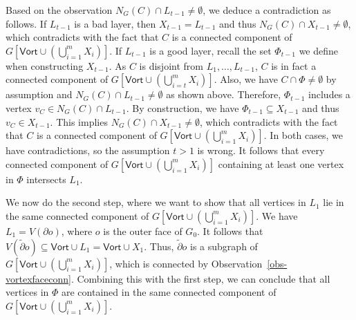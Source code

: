 \documentclass[a4paper,11pt]{article}
\numberwithin{lemma}{section}
\begin{document}
Based on the observation $N_G(C) \cap L_{t-1} \neq \emptyset$, we deduce a contradiction as follows.
If $L_{t-1}$ is a bad layer, then $X_{t-1} = L_{t-1}$ and thus $N_G(C) \cap X_{t-1} \neq \emptyset$, which contradicts with the fact that $C$ is a connected component of $G[\mathsf{Vort} \cup (\bigcup_{i=1}^m X_i)]$.
If $L_{t-1}$ is a good layer, recall the set $\varPhi_{t-1}$ we define when constructing $X_{t-1}$.
As $C$ is disjoint from $L_1,\dots,L_{t-1}$, $C$ is in fact a connected component of $G[\mathsf{Vort} \cup (\bigcup_{i=t}^m X_i)]$.
Also, we have $C \cap \varPhi \neq \emptyset$ by assumption and $N_G(C) \cap L_{t-1} \neq \emptyset$ as shown above.
Therefore, $\varPhi_{t-1}$ includes a vertex $v_C \in N_G(C) \cap L_{t-1}$.
By construction, we have $\varPhi_{t-1} \subseteq X_{t-1}$ and thus $v_C \in X_{t-1}$.
This implies $N_G(C) \cap X_{t-1} \neq \emptyset$, which contradicts with the fact that $C$ is a connected component of $G[\mathsf{Vort} \cup (\bigcup_{i=1}^m X_i)]$.
In both cases, we have contradictions, so the assumption $t>1$ is wrong.
It follows that every connected component of $G[\mathsf{Vort} \cup (\bigcup_{i=1}^m X_i)]$ containing at least one vertex in $\varPhi$ intersects $L_1$.

We now do the second step, where we want to show that all vertices in $L_1$ lie in the same connected component of $G[\mathsf{Vort} \cup (\bigcup_{i=1}^m X_i)]$.
We have $L_1 = V(\partial o)$, where $o$ is the outer face of $G_0$.
It follows that $V(\tilde{\partial} o) \subseteq \mathsf{Vort} \cup L_1 = \mathsf{Vort} \cup X_1$.
Thus, $\tilde{\partial} o$ is a subgraph of $G[\mathsf{Vort} \cup (\bigcup_{i=1}^m X_i)]$, which is connected by Observation~\ref{obs-vortexfaceconn}.
Combining this with the first step, we can conclude that all vertices in $\varPhi$ are contained in the same connected component of $G[\mathsf{Vort} \cup (\bigcup_{i=1}^m X_i)]$.
\end{document}
